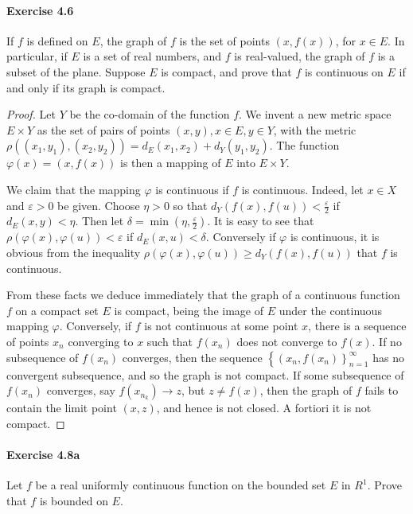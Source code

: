 \documentclass{article}
\theoremstyle{definition}
\begin{document}
\paragraph{Exercise 4.6} If $f$ is defined on $E$, the graph of $f$ is the set of points $(x, f(x))$, for $x \in E$. In particular, if $E$ is a set of real numbers, and $f$ is real-valued, the graph of $f$ is a subset of the plane. Suppose $E$ is compact, and prove that $f$ is continuous on $E$ if and only if its graph is compact.
\begin{proof}
    Let $Y$ be the co-domain of the function $f$. We invent a new metric space $E \times Y$ as the set of pairs of points $(x, y), x \in E, y \in Y$, with the metric $\rho\left(\left(x_1, y_1\right),\left(x_2, y_2\right)\right)=d_E\left(x_1, x_2\right)+d_Y\left(y_1, y_2\right)$. The function $\varphi(x)=(x, f(x))$ is then a mapping of $E$ into $E \times Y$.

We claim that the mapping $\varphi$ is continuous if $f$ is continuous. Indeed, let $x \in X$ and $\varepsilon>0$ be given. Choose $\eta>0$ so that $d_Y(f(x), f(u))<\frac{\varepsilon}{2}$ if $d_E(x, y)<\eta$. Then let $\delta=\min \left(\eta, \frac{\varepsilon}{2}\right)$. It is easy to see that $\rho(\varphi(x), \varphi(u))<\varepsilon$ if $d_E(x, u)<\delta$. Conversely if $\varphi$ is continuous, it is obvious from the inequality $\rho(\varphi(x), \varphi(u)) \geq d_Y(f(x), f(u))$ that $f$ is continuous.

From these facts we deduce immediately that the graph of a continuous function $f$ on a compact set $E$ is compact, being the image of $E$ under the continuous mapping $\varphi$. Conversely, if $f$ is not continuous at some point $x$, there is a sequence of points $x_n$ converging to $x$ such that $f\left(x_n\right)$ does not converge to $f(x)$. If no subsequence of $f\left(x_n\right)$ converges, then the sequence $\left\{\left(x_n, f\left(x_n\right)\right\}_{n=1}^{\infty}\right.$ has no convergent subsequence, and so the graph is not compact. If some subsequence of $f\left(x_n\right)$ converges, say $f\left(x_{n_k}\right) \rightarrow z$, but $z \neq f(x)$, then the graph of $f$ fails to contain the limit point $(x, z)$, and hence is not closed. A fortiori it is not compact.
\end{proof}



\paragraph{Exercise 4.8a} Let $f$ be a real uniformly continuous function on the bounded set $E$ in $R^{1}$. Prove that $f$ is bounded on $E$.
\end{document}

